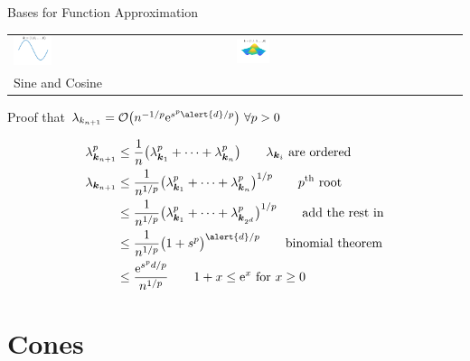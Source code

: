 \documentclass[10pt,compress,xcolor={usenames,dvipsnames},aspectratio=169]{beamer}
\begin{document}
\begin{frame}{Bases for Function Approximation}
\begin{tabular}{>{\centering}m{}>{\centering}m{}>{\centering}m{}>{\centering}m{}>{\centering}m{}}
\includegraphics[width =0.18\textwidth]{ProgramsImages/CosineSine_Degree_1_k.png}  &
\includegraphics[width =0.18\textwidth]{ProgramsImages/CosineSine_Degree_1_1_k.png}   
\tabularnewline[-7ex]
Sine and Cosine \tabularnewline
	\end{tabular}
\end{frame}



\begin{frame}{Proof that $\lambda_{k_{n+1}} = \Order\bigl(n^{-1/p}\me^{s^p\alert{d}/p}\bigr) \ \forall p > 0$}

\begin{align*}
    \lambda_{\vk_{n+1}}^p &\le \frac 1n \bigl( \lambda_{\vk_{1}}^p + \cdots + \lambda_{\vk_{n}}^p \bigr) \qquad \lambda_{\vk_{i}} \text{ are ordered} \\
    \lambda_{\vk_{n+1}} &\le \frac 1{n^{1/p}} \bigl( \lambda_{\vk_{1}}^p + \cdots + \lambda_{\vk_{n}}^p \bigr)^{1/p} \qquad p^{\text{th}} \text{ root} \\
     &\le \frac 1{n^{1/p}} \bigl( \lambda_{\vk_{1}}^p + \cdots + \lambda_{\vk_{2^d}}^p \bigr)^{1/p} \qquad  \text{add the rest in} \\
     &\le \frac 1{n^{1/p}} \bigl( 1 + s^p \bigr)^{\alert{d}/p} \qquad  \text{binomial theorem} \\
     & \le \frac {\me^{s^pd/p}}{n^{1/p}} \qquad 1 + x \le \me^x \text{ for } x \ge 0
\end{align*}
    
\end{frame}


\section{Cones}
\end{document}
